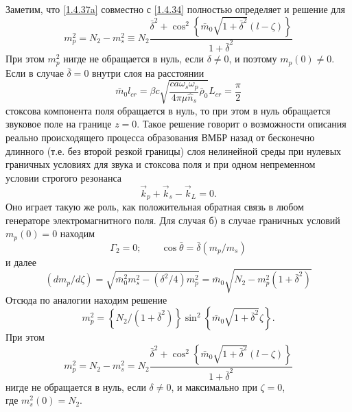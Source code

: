 \documentclass[a4paper]{article}
\begin{document}
Заметим, что \eqref{1.4.37a} совместно с \eqref{1.4.34} полностью определяет и решение для 
\begin{equation}
	m_{p}^{2}=N_{2}-m_{s}^{2}\equiv N_{2}\frac{\bar{\delta}^{2}+\cos^{2}\left\{\bar{m}_{0}\sqrt{1+\bar{\delta}^{2}}(l-\zeta)\right\}}{1+\bar{\delta}^{2}}
	\label{1.4.38a}\tag{38a}
\end{equation}
При этом $m_{p}^{2}$ нигде не обращается в нуль, если $\delta\neq0$, и поэтому $m_{p}(0)\neq0$.
\setcounter{equation}{38}
Если в случае $\bar{\delta}=0$  внутри слоя на расстоянии 
\begin{equation}
	\bar{m}_{0}l_{cr}=\beta c\sqrt{\frac{ca\omega_{s}\omega_{p}}{4\pi\mu\hat{n}_{s}}\bar{\rho}_{0}}L_{cr}=\frac{\pi}{2}
	\label{1.4.39}
\end{equation}
стоксова компонента поля обращается в нуль, то при этом в нуль обращается звуковое поле на границе $z=0$. Такое решение говорит о возможности описания реально происходящего процесса образования ВМБР назад от бесконечно длинного (т.е. без второй резкой границы) слоя нелинейной среды при нулевых граничных условиях для звука и стоксова поля и при одном непременном условии строгого резонанса
\begin{equation}
	\vec{k}_{p}+\vec{k}_{s}-\vec{k}_{L}=0.
	\label{1.4.40}
\end{equation}
Оно играет такую же роль, как положительная обратная связь в любом генераторе электромагнитного поля. 
Для случая б) в случае  граничных условий $m_{p}(0)=0$  находим 
\begin{equation}
	\Gamma_{2}=0;\qquad\cos\bar{\theta}=\bar{\delta}(m_{p}/m_{s})
	\tag{35б}\label{1.4.35б}
\end{equation}
и далее
\begin{equation}
	(dm_{p}/d\zeta)=\sqrt{\bar{m}_{0}^{2}m_{s}^{2}-(\delta^{2}/4)m_{p}^{2}}=\bar{m}_{0}\sqrt{N_{2}-m_{p}^{2}(1+\bar{\delta}^{2})}
	\tag{36б}\label{1.4.36б}
\end{equation}
Отсюда по аналогии находим решение 
\begin{equation}
	m_{p}^{2}=\left\{N_{2}/(1+\bar{\delta}^{2})\right\}\sin^{2}\left\{\bar{m}_{0}\sqrt{1+\bar{\delta}^{2}}\zeta\right\}.
	\tag{37б}\label{1.4.37б}
\end{equation}
При этом	
\begin{equation}
m_{p}^{2}=N_{2}-m_{s}^{2}=N_{2}\frac{\bar{\delta}^{2}+\cos^{2}\left\{\bar{m}_{0}\sqrt{1+\bar{\delta}^{2}}(l-\zeta)\right\}}{1+\bar{\delta}^{2}}
	\tag{38б}\label{1.4.38б}
\end{equation}
нигде не обращается в нуль, если $\delta\neq0$, и максимально при $\zeta=0$, \\где $m_{s}^{2}(0)=N_{2}$. 
\end{document}
